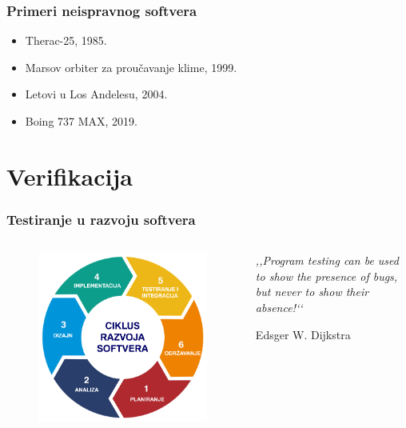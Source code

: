 \documentclass{beamer}
\begin{document}
\begin{frame}

\frametitle{Primeri neispravnog softvera}
\begin{itemize}
\item Therac-25, 1985.
\item Marsov orbiter za proučavanje klime, 1999.
\item Letovi u Los Andelesu, 2004.
\item Boing 737 MAX, 2019.
\end{itemize}
\end{frame}

\section{Verifikacija}
\begin{frame}
\frametitle{Testiranje u razvoju softvera}
\begin{columns}[c] %
\begin{figure}
\includegraphics[width=1\linewidth]{rs.png}
\end{figure}

\epigraph{\emph{,,Program testing can be used to show the presence of bugs, but never to show their absence!‘‘}}{Edsger W. Dijkstra}

\end{columns}
\end{frame}
\end{document}
